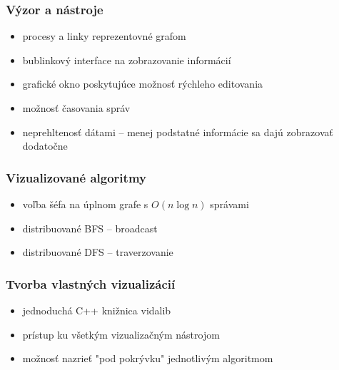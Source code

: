 \documentclass{beamer}
\begin{document}
\begin{frame}
    \frametitle{Výzor a nástroje}

    \begin{block}{}
    \begin{itemize}
        \vfill\item procesy a linky reprezentovné grafom
        \vfill\item bublinkový interface na zobrazovanie informácií
        \vfill\item grafické okno poskytujúce možnosť rýchleho editovania
        \vfill\item možnosť časovania správ
        \vfill\item neprehltenosť dátami -- menej podstatné informácie sa dajú zobrazovať dodatočne
    \end{itemize}
    \end{block}


\end{frame}

\begin{frame}
    \frametitle{Vizualizované algoritmy}

    \begin{block}{}
    \begin{itemize}
        \vfill\item voľba šéfa na úplnom grafe s $O(n\log n)$ správami
        \vfill\item distribuované BFS -- broadcast
        \vfill\item distribuované DFS -- traverzovanie
    \end{itemize}
    \end{block}

\end{frame}

\begin{frame}
    \frametitle{Tvorba vlastných vizualizácií}

    \begin{block}{}
    \begin{itemize}
        \vfill\item jednoduchá C++ knižnica vidalib
        \vfill\item prístup ku všetkým vizualizačným nástrojom
        \vfill\item možnosť nazrieť "pod pokrývku" jednotlivým algoritmom
    \end{itemize}
    \end{block}


\end{frame}

\end{document}
